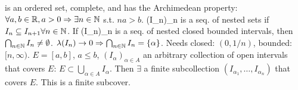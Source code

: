 \R is an ordered set, complete, and has the Archimedean property:
$\forall a, b \in \mathbb{R}, a > 0 \Rightarrow \exists n \in \mathbb{N}$ s.t. $na > b$.
 (I_n)_{n \in \N} is a seq. of nested sets if $I_n \subseteq I_{n+1} \forall n \in \mathbb{N}$.
If (I_n)_{n \in \N} is a seq. of nested closed bounded intervals, then $\bigcap_{n \in \mathbb{N}} I_n \neq \emptyset$.
$\lambda(I_n) \to 0 \Rightarrow \bigcap_{n \in \mathbb{N}} I_n = \{\alpha\}$.
Needs closed: $(0, 1/n)$, bounded: $[n, \infty)$.
 $E = [a, b]$, $a \le b$, $(I_\alpha)_{\alpha \in A}$ an arbitrary collection
of open intervals that covers $E$: $E \subset \bigcup_{\alpha \in A} I_\alpha$.
Then $\exists$ a finite subcollection $(I_{\alpha_1}, \dots, I_{\alpha_n})$
that covers $E$. This is a finite subcover.
